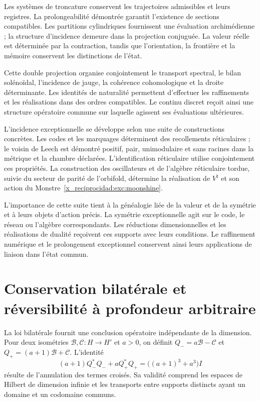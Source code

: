 Les systèmes de troncature conservent les trajectoires admissibles et leurs registres. La prolongeabilité démontrée garantit l’existence de sections compatibles. Les partitions cylindriques fournissent une évaluation archimédienne ; la structure d’incidence demeure dans la projection conjuguée. La valeur réelle est déterminée par la contraction, tandis que l’orientation, la frontière et la mémoire conservent les distinctions de l’état.

Cette double projection organise conjointement le transport spectral, le bilan solénoïdal, l’incidence de jauge, la cohérence cohomologique et la droite déterminante. Les identités de naturalité permettent d’effectuer les raffinements et les réalisations dans des ordres compatibles. Le continu discret reçoit ainsi une structure opératoire commune sur laquelle agissent ses évaluations ultérieures.

L’incidence exceptionnelle se développe selon une suite de constructions concrètes. Les codes et les marquages déterminent des recollements réticulaires ; le voisin de Leech est démontré positif, pair, unimodulaire et sans racines dans la métrique et la chambre déclarées. L’identification réticulaire utilise conjointement ces propriétés. La construction des oscillateurs et de l’algèbre réticulaire tordue, suivie du secteur de parité de l’orbifold, détermine la réalisation de \(V^\natural\) et son action du Monstre~\ref{x_reciprocidad:exc:moonshine}.

L’importance de cette suite tient à la généalogie liée de la valeur et de la symétrie et à leurs objets d’action précis. La symétrie exceptionnelle agit sur le code, le réseau ou l’algèbre correspondants. Les réductions dimensionnelles et les réalisations de dualité reçoivent ces supports avec leurs conditions. Le raffinement numérique et le prolongement exceptionnel conservent ainsi leurs applications de liaison dans l’état commun.

\section{Conservation bilatérale et réversibilité à profondeur arbitraire}

La loi bilatérale fournit une conclusion opératoire indépendante de la dimension. Pour deux isométries \(\mathcal B,\mathcal C:H\to H'\) et \(a>0\), on définit \(Q_-=a\mathcal B-\mathcal C\) et \(Q_+=(a+1)\mathcal B+\mathcal C\). L’identité
\[
 (a+1)Q_-^*Q_-+aQ_+^*Q_+
 =\bigl((a+1)^3+a^3\bigr)I
\]
résulte de l’annulation des termes croisés. Sa validité comprend les espaces de Hilbert de dimension infinie et les transports entre supports distincts ayant un domaine et un codomaine communs.

